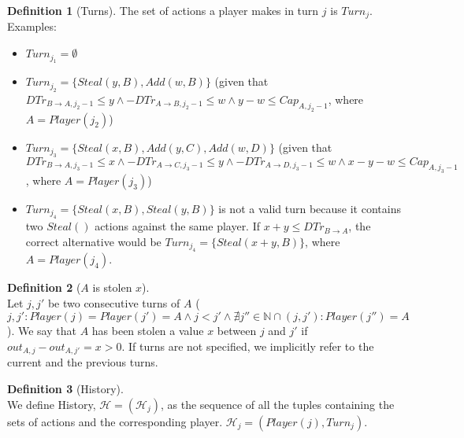 \documentclass[11pt]{article}
\theoremstyle{definition}
\newtheorem{definition}{Definition}[section]
\theoremstyle{corollary}
\theoremstyle{lemma}
\begin{document}
\begin{definition}[Turns]
         The set of actions a player makes in turn $j$ is $Turn_j$. Examples:
         \begin{itemize}
            \item $Turn_{j_1} = \emptyset$
            \item $Turn_{j_2} = \{Steal(y, B), Add(w, B)\}$ (given that $DTr_{B \rightarrow A, j_2 - 1} \leq y \wedge
            -DTr_{A \rightarrow B, j_2 - 1} \leq w \wedge y - w \leq Cap_{A, j_2-1}$, where $A = Player(j_2)$)
            \item $Turn_{j_3} = \{Steal(x, B), Add(y, C), Add(w, D)\}$ (given that $DTr_{B \rightarrow A, j_3 - 1} \leq x
            \wedge -DTr_{A \rightarrow C, j_3-1} \leq y \wedge -DTr_{A \rightarrow D, j_3 - 1} \leq w \wedge
            x - y - w \leq Cap_{A, j_3-1}$, where $A = Player(j_3)$)
            \item $Turn_{j_4} = \{Steal(x, B), Steal(y, B)\}$ is not a valid turn because it contains two $Steal()$ actions
            against the same player. If $x + y \leq DTr_{B \rightarrow A}$, the correct alternative would be $Turn_{j_4} =
            \{Steal(x+y, B)\}$, where $A = Player(j_4)$.
         \end{itemize}
      \end{definition}
      \begin{definition}[$A$ is stolen $x$] \ \\
         Let $j, j'$ be two consecutive turns of $A$ ($j, j' : Player(j) = Player(j') = A \wedge j < j' \wedge \nexists j''
         \in \mathbb{N} \cap (j, j') : Player(j'') = A$). We say that $A$ has been stolen a value $x$ between $j$ and $j'$
         if $out_{A,j} - out_{A,j'} = x > 0$. If turns are not specified, we implicitly refer to the current and the
         previous turns.
      \end{definition}
      \begin{definition}[History] \ \\
         We define History, $\mathcal{H} = (\mathcal{H}_j)$, as the sequence of all the tuples containing the sets of actions
         and the corresponding player. $\mathcal{H}_j = (Player(j), Turn_j)$.
      \end{definition}
\end{document}
